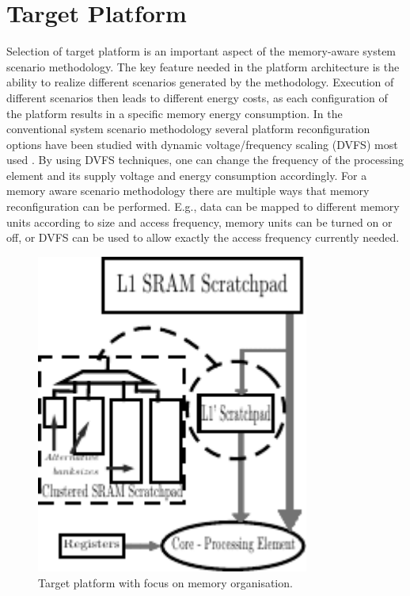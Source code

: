 \section{Target Platform}
\label{sec:platform}

Selection of target platform is an important aspect of the memory-aware system scenario methodology. The key feature needed in the platform architecture is the ability to realize different scenarios generated by the methodology. Execution of different scenarios then leads to different energy costs, as each configuration of the platform results in a specific memory energy consumption. In the conventional system scenario methodology several platform reconfiguration options have been studied \cite{Gheorghita2007} with dynamic voltage/frequency scaling (DVFS) most used \cite{dvfs}. By using DVFS techniques, one can change the frequency of the processing element and its supply voltage and energy consumption accordingly. For a memory aware scenario methodology there are multiple ways that memory reconfiguration can be performed. E.g., data can be mapped to different memory units according to size and access frequency, memory units can be turned on or off, or DVFS can be used to allow exactly the access frequency currently needed. 

\begin{figure}[!t]
\centering
\includegraphics[width=0.8\textwidth]{A/platform_v10-eps-converted-to.pdf}
\caption{Target platform with focus on memory organisation.}
\label{fig:platformA}
\end{figure}

